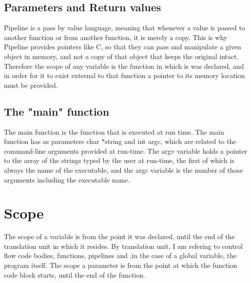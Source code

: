 \documentclass[./LRM_main.tex]{subfiles}
\begin{document}
\subsection{Parameters and Return values}
Pipeline is a pass by value language, meaning that whenever a value is passed to another function or from another function, it is merely a copy. This is why Pipeline provides pointers like C, so that they can pass and manipulate a given object in memory, and not a copy of that object that keeps the original intact. Therefore the scope of any variable is the function in which is was declared, and in order for it to exist external to that function a pointer to its memory location must be provided.
\subsection{The "main" function}
The main function is the function that is executed at run time. The main function has as parameters char *string and int argc, which are related to the command-line arguments provided at run-time. The argv variable holds a pointer to the array of the strings typed by the user at run-time, the first of which is always the name of the executable, and the argc variable is the number of those arguments including the executable name.
\section{Scope}
The scope of a variable is from the point it was declared, until the end of the translation unit in which it resides. By translation unit, I am refering to control flow code bodies, functions, pipelines and ,in the case of a global variable, the program itself. The scope a parameter is from the point at which the function code block starts, until the end of the function.




\end{document}
